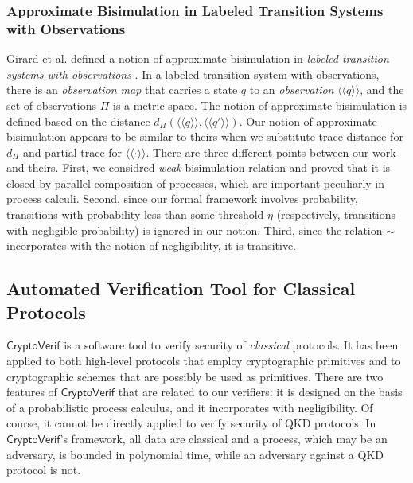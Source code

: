 \subsubsection{Approximate Bisimulation in Labeled Transition Systems
   with Observations}
Girard et al. defined a notion of approximate bisimulation in \emph{labeled
transition systems with observations} \cite{Girard2005}.
In a labeled transition system with observations, there is an
\emph{observation map}
that carries a state $q$ to an \emph{observation}  $\langle\!\langle q
\rangle\!\rangle$, and the set of observations $\Pi$ is a metric space.
The notion of approximate bisimulation is defined based on
the distance $d_{\Pi}(\langle\!\langle q \rangle\!\rangle,
\langle\!\langle q' \rangle\!\rangle)$.
Our notion of approximate bisimulation appears to be similar to
theirs when we substitute trace distance for $d_{\Pi}$ and
partial trace for $\langle\!\langle \cdot \rangle\!\rangle$.
There are three different points between our work and theirs.
First, we considred \emph{weak} bisimulation relation and proved
that it is closed by parallel composition of processes,
which are important peculiarly in process calculi.
Second, since our formal framework involves probability,
transitions with probability less than some threshold $\eta$
(respectively, transitions with negligible probability) is ignored in our
notion. Third, since the relation $\sim$ incorporates with 
the notion of negligibility, it is transitive.

\subsection{Automated Verification Tool for Classical Protocols}
$\mathsf{CryptoVerif}$ \cite{Blanchet2008cryptoverif} is a software tool
to verify security of
\emph{classical} protocols. It has been applied to
both high-level protocols \cite{Blanchet2008Kerberos, Blanchet2012oeke} 
that employ cryptographic primitives and to
cryptographic schemes \cite{Blanchet2006FDH} that are possibly be
used as primitives.
There are two features of $\mathsf{CryptoVerif}$ that are 
related to our verifiers: it is designed on the basis of a probabilistic
process calculus, and it incorporates with negligibility.
Of course, it cannot be directly applied to verify security of QKD
protocols. In $\mathsf{CryptoVerif}$'s framework,
all data are classical and
a process, which may be an adversary,
is bounded in polynomial time, while an adversary against a QKD protocol
is not. 

